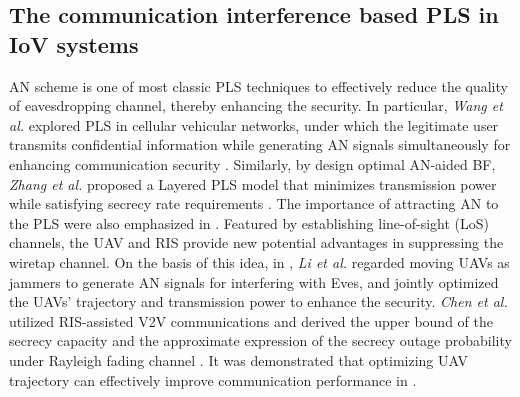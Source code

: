 \subsection{The communication interference based PLS in IoV systems}
AN scheme is one of most classic PLS techniques to effectively reduce the quality of eavesdropping channel, thereby enhancing the security.
In particular, \emph{Wang et al.} explored PLS in cellular vehicular networks, under which the legitimate user transmits confidential information while generating AN signals simultaneously for enhancing communication security \cite{wang2020physical}. Similarly, by design optimal AN-aided BF, \emph{Zhang et al.} proposed a Layered PLS model that minimizes transmission power while satisfying secrecy rate requirements \cite{Zhang2019Transmit}. The importance of attracting AN to the PLS were also emphasized in \cite{yin2021uav,jin2024enhanced}.
Featured by establishing line-of-sight (LoS) channels, the UAV and RIS provide new potential advantages in suppressing the wiretap channel. On the basis of this idea, in \cite{Li2019UAV}, \emph{Li et al.} regarded moving UAVs as jammers to generate AN signals for interfering with Eves, and jointly optimized the UAVs' trajectory and transmission power to enhance the security. \emph{Chen et al.} utilized RIS-assisted V2V communications and derived the upper bound of the secrecy capacity and the approximate expression of the secrecy outage probability under Rayleigh fading channel \cite{Chen2024Physical}.
It was demonstrated that optimizing UAV trajectory can effectively improve communication performance in \cite{Xu2021Low,Zhou2018Improving}.

